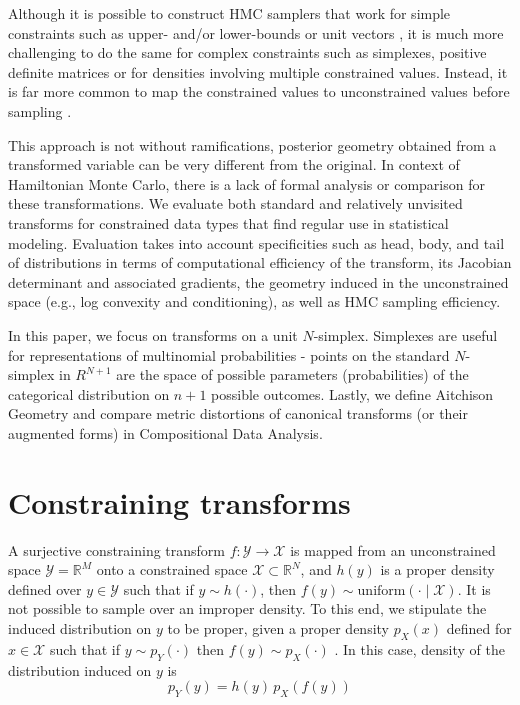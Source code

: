 \documentclass[11pt]{article}
\begin{document}
Although it is possible to construct HMC samplers that work for simple constraints such as upper- and/or lower-bounds \cite{neal2011mcmc} or unit vectors \cite{byrne2013geodesic}, it is much more challenging to do the same for complex constraints such as simplexes, positive definite matrices or for densities involving multiple constrained values.  Instead, it is far more common to map the constrained values to unconstrained values before sampling \cite{JSSv076i01, radul2021base, fjelde2020bijectors}.

This approach is not without ramifications, posterior geometry obtained from a transformed variable can be very different from the original. In context of Hamiltonian Monte Carlo, there is a lack of formal analysis or comparison for these transformations.  We evaluate both standard and relatively unvisited transforms for constrained data types that find regular use in statistical modeling. Evaluation takes into account specificities such as head, body, and tail of distributions in terms of computational efficiency of the transform, its Jacobian determinant and associated gradients, the geometry induced in the unconstrained space (e.g., log convexity and conditioning), as well as HMC sampling efficiency.

In this paper, we focus on transforms on a unit $N$-simplex. Simplexes are useful for representations of multinomial probabilities - points on the standard $N$-simplex in $R^{N+1}$ are the space of possible parameters (probabilities) of the categorical distribution on $n+1$ possible outcomes. Lastly, we define Aitchison Geometry and compare metric distortions of canonical transforms (or their augmented forms) in Compositional Data Analysis.
\section{Constraining transforms}

A surjective constraining transform $f : \mathcal{Y} \rightarrow \mathcal{X}$ is mapped from an unconstrained space $\mathcal{Y} = \mathbb{R}^M$ onto a constrained space $\mathcal{X} \subset \mathbb{R}^N$, and $h(y)$ is a proper density defined over $y \in \mathcal{Y}$ such that if $y \sim h(\cdot)$, then $f(y) \sim \textrm{uniform}(\cdot \mid \mathcal{X})$.  It is not possible to sample over an improper density.  To this end, we stipulate the induced distribution on $y$ to be proper, given a proper density $p_X(x)$ defined for $x \in \mathcal{X}$ such that if $y \sim p_Y(\cdot)$ then $f(y) \sim p_X(\cdot)$ . In this case, density of the distribution induced on $y$ is 
\[
p_Y(y) = h(y) \, p_X(f(y))
\]
\end{document}
